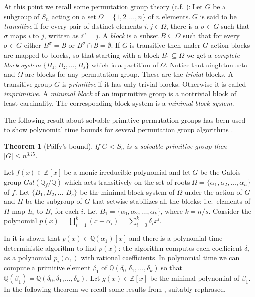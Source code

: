 \documentclass{article}
\newtheorem{theorem}{Theorem}[section]
\newcommand{\Gal}[1]{\ensuremath{Gal\left(#1\right)}}
\newcommand{\Q}[0]{\ensuremath{\mathbb{Q}}}
\newcommand{\Z}[0]{\ensuremath{\mathbb{Z}}}
\begin{document}
At this point we recall some permutation group theory (c.f.
\cite{wielandt64finite}): Let $G$ be a subgroup of $S_n$ acting on a
set $\Omega = \{1,2,\ldots,n\}$ of $n$ elements. $G$ is said to be
\emph{transitive} if for every pair of distinct elements $i,
j\in\Omega$, there is a $\sigma\in G$ such that $\sigma$ maps $i$ to
$j$, written as $i^{\sigma}=j$. A \emph{block} is a subset
$B\subseteq\Omega$ such that for every $\sigma\in G$ either
$B^{\sigma}=B$ or $B^{\sigma}\cap B=\emptyset$.  If $G$ is transitive
then under $G$-action blocks are mapped to blocks, so that starting
with a block $B_1\subseteq\Omega$ we get a \emph{complete block
  system} $\{B_1,B_2 ,\ldots, B_s\}$ which is a partition of $\Omega$.
Notice that singleton sets and $\Omega$ are blocks for any permutation
group. These are the \emph{trivial} blocks. A transitive group $G$ is
\emph{primitive} if it has only trivial blocks. Otherwise it is called
\emph{imprimitive}. A \emph{minimal block} of an imprimitive group is
a nontrivial block of least cardinality. The corresponding block
system is a \emph{minimal block system}.
 
The following result about solvable primitive permutation groups
\cite{palfy:1982:primitive} has been used to show polynomial time
bounds for several permutation group algorithms
\cite{luks93permutation}.

\begin{theorem}[P\'alfy's bound]{\rm\cite{palfy:1982:primitive}}
  If $G<S_n$ is a solvable primitive group then $|G|\leq n^{3.25}$.
\end{theorem}

Let $f(x) \in \Z[x]$ be a monic irreducible polynomial and let $G$ be
the Galois group $\Gal{\Q_f/\Q}$ which acts transitively on the set of
roots $\Omega = \{ \alpha_1,\alpha_2,\ldots,\alpha_n\}$ of $f$. Let
$\{ B_1,B_2 ,\ldots, B_s\}$ be the minimal block system of $\Omega$
under the action of $G$ and $H$ be the subgroup of $G$ that setwise
stabilizes all the blocks: i.e.\ elements of $H$ map $B_i$ to $B_i$
for each $i$. Let $B_1 = \{ \alpha_1,\alpha_2, \ldots, \alpha_k\}$,
where $k =n/s$. Consider the polynomial $p(x) = \prod_{i=1}^k (x -
\alpha_i) = \sum_{i=0}^k \delta_i x^i$.

In \cite{landau85solvability} it is shown that $p(x) \in
\Q(\alpha_1)[x]$ and there is a polynomial time deterministic
algorithm to find $p(x)$: the algorithm computes each coefficient
$\delta_i$ as a polynomial $p_i(\alpha_1)$ with rational coefficients.
In polynomial time we can compute a primitive element $\beta_1$ of
$\Q(\delta_0,\delta_1,\ldots,\delta_k)$ \cite{landau85solvability} so
that $\Q(\beta_1) = \Q(\delta_0,\delta_1,\ldots,\delta_k)$. Let $g(x)
\in \Z[x]$ be the minimal polynomial of $\beta_1$. In the following
theorem we recall some results from \cite{landau85solvability},
suitably rephrased.
\end{document}
